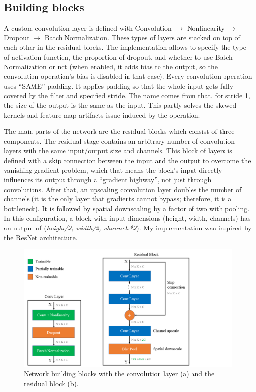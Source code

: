 \subsection{Building blocks}

A custom convolution layer is defined with Convolution $\rightarrow$ Nonlinearity $\rightarrow$ Dropout $\rightarrow$ Batch Normalization. These types of layers are stacked on top of each other in the residual blocks. The implementation allows to specify the type of activation function, the proportion of dropout, and whether to use Batch Normalization or not (when enabled, it adds bias to the output, so the convolution operation's bias is disabled in that case). Every convolution operation uses ``SAME'' padding. It applies padding so that the whole input gets fully covered by the filter and specified stride. The name comes from that, for stride 1, the size of the output is the same as the input. This partly solves the skewed kernels and feature-map artifacts issue induced by the operation\cite{PadBlindSpot}.

The main parts of the network are the residual blocks which consist of three components. The residual stage contains an arbitrary number of convolution layers with the same input/output size and channels. This block of layers is defined with a skip connection between the input and the output to overcome the vanishing gradient problem, which that means the block's input directly influences its output through a ``gradient highway'', not just through convolutions. After that, an upscaling convolution layer doubles the number of channels (it is the only layer that gradients cannot bypass; therefore, it is a bottleneck). It is followed by spatial downscaling by a factor of two with pooling. In this configuration, a block with input dimensions (height, width, channels) has an output of (\textit{height/2, width/2, channels*2}). My implementation was inspired by the ResNet\cite{ResNet} architecture.

\begin{figure}[htb]
 \centerline{\includegraphics[width=.85\columnwidth]{.//Figure/OCR/Slide4.PNG}}
 \caption{Network building blocks with the convolution layer (a) and the residual block (b).}
 \label{fig:simple}
\end{figure}

